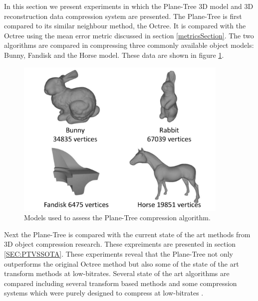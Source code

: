 
In this section we present experiments in which the Plane-Tree 3D model and 3D reconstruction data compression system are presented. The Plane-Tree is first compared to its similar neighbour method, the Octree. It is compared with the Octree using the mean error metric discussed in section \ref{metricsSection}. The two algorithms are compared in compressing three commonly available object models: Bunny, Fandisk and the Horse model. These data are shown in figure \ref{fig:MODELSUSEDA}. \\

\begin{figure}[!htb]
\centering
\includegraphics[width=4.0in]{images/experiments/test_data/modelsused}
\caption{Models used to assess the Plane-Tree compression algorithm.}
\label{fig:MODELSUSEDA}
\end{figure}


Next the Plane-Tree is compared with the current state of the art methods from 3D object compression research. These expreiments are presented in section \ref{SEC:PTVSSOTA}. These experiments reveal that the Plane-Tree not only outperforms the original Octree method but also some of the state of the art transform methods at low-bitrates. Several state of the art algorithms are compared including several transform based methods \cite{Khodakovsky00Progressive,Bayazit103DMesh} and some compression systems which were purely designed to compress at low-bitrates \cite{Peng10Feature}. \\ 

